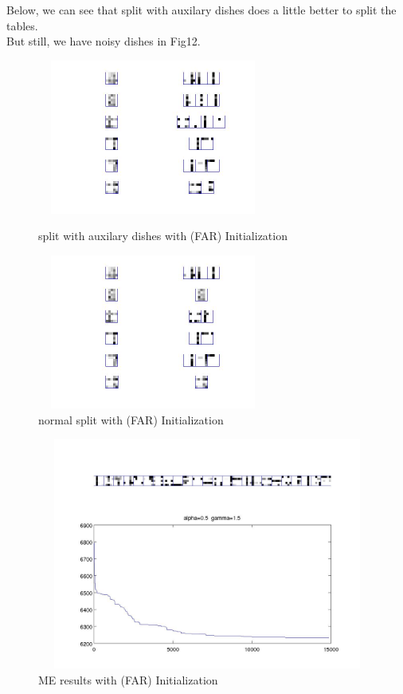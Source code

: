 \documentclass{article}
\begin{document}
\begin{spacing}{1.1}
Below, we can see that split with auxilary dishes does a little better to split the tables.\\
But still, we have noisy dishes in Fig12.

\begin{figure}[h] 
  \begin{minipage}[b]{0.5\textwidth} 
    \centering 
    \includegraphics[width=3in,height=2in]{shape_local_end.jpg} 
    \caption{split with auxilary dishes with (FAR) Initialization}
    \label{fig:by:table} 
  \end{minipage}%
  \begin{minipage}[b]{0.5\textwidth} 
    \centering 
    \includegraphics[width=3in,height=2in]{shape_end.jpg} 
    \caption{normal split with (FAR) Initialization}
    \label{fig:by:table}  
   \end{minipage}%
\end{figure}
\begin{figure}[h] 
    \centering 
    \includegraphics[width=5in,height=3in]{shape_local_split.jpg} 
    \caption{ME results with (FAR) Initialization}
    \label{fig:by:table} 
\end{figure}


\end{spacing}
\end{document}

